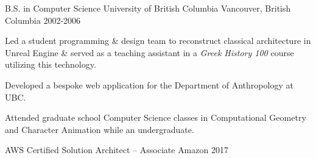 

\begin{cventries}

  \cventry
    {B.S. in Computer Science} %
    {University of British Columbia} %
    {Vancouver, British Columbia} %
    {2002-2006} %
    {
      \begin{cvitems} %
        \item {Led a student programming \& design team to reconstruct classical architecture in Unreal Engine \& served as a teaching assistant in a \textit{Greek History 100} course utilizing this technology.}
        \item {Developed a bespoke web application for the Department of Anthropology at UBC.}
        \item {Attended graduate school Computer Science classes in Computational Geometry and Character Animation while an undergraduate.}
      \end{cvitems}
    }

  \cventry
    {AWS Certified Solution Architect – Associate} %
    {Amazon} %
    {} %
    {2017} %
    {}

\end{cventries}
